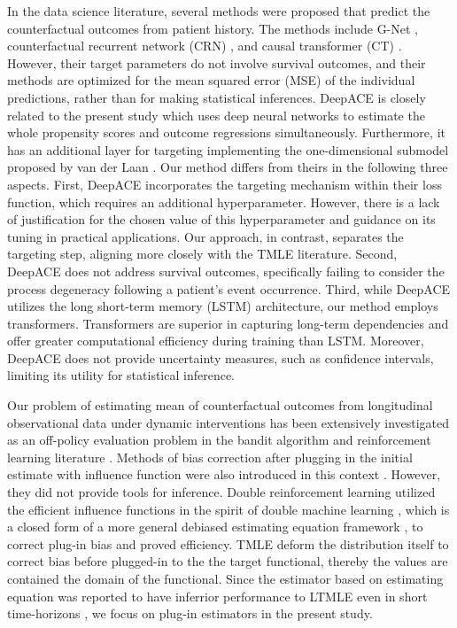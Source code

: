 \documentclass{article}
\theoremstyle{plain}
\theoremstyle{definition}
\theoremstyle{remark}
\begin{document}
In the data science literature, several methods were proposed that predict the counterfactual outcomes from patient history. The methods include G-Net \cite{liGNetDeepLearning2020a}, counterfactual recurrent network (CRN) \cite{Bica2020Estimating}, and causal transformer (CT) \cite{pmlr-v162-melnychuk22a}. However, their target parameters do not involve survival outcomes, and their methods are optimized for the mean squared error (MSE) of the individual predictions, rather than for making statistical inferences. DeepACE \cite{Frauen_Hatt_Melnychuk_Feuerriegel_2023} is closely related to the present study which uses deep neural networks to estimate the whole propensity scores and outcome regressions simultaneously. Furthermore, it has an additional layer for targeting implementing the one-dimensional submodel proposed by van der Laan \cite{van2018targeted}. Our method differs from theirs in the following three aspects. First, DeepACE incorporates the targeting mechanism within their loss function, which requires an additional hyperparameter. However, there is a lack of justification for the chosen value of this hyperparameter and guidance on its tuning in practical applications. Our approach, in contrast, separates the targeting step, aligning more closely with the TMLE literature. Second, DeepACE does not address survival outcomes, specifically failing to consider the process degeneracy following a patient's event occurrence. Third, while DeepACE utilizes the long short-term memory (LSTM) architecture, our method employs transformers. Transformers are superior in capturing long-term dependencies and offer greater computational efficiency during training than LSTM. Moreover, DeepACE does not provide uncertainty measures, such as confidence intervals, limiting its utility for statistical inference.

Our problem of estimating mean of counterfactual outcomes from longitudinal observational data under dynamic interventions has been extensively investigated as an off-policy evaluation problem in the bandit algorithm and reinforcement learning literature \cite{levineORL}. Methods of bias correction after plugging in the initial estimate with influence function were also introduced in this context \cite{jiangDROPE,farajtabarMRDROPE,naritaDOPE}. However, they did not provide tools for inference. Double reinforcement learning \cite{ueharaDRL} utilized the efficient influence functions in the spirit of double machine learning \cite{chernozhukovDML}, which is a closed form of a more general debiased estimating equation framework \cite{cherLocally}, to correct plug-in bias and proved efficiency. TMLE deform the distribution itself to correct bias before plugged-in to the the target functional, thereby the values are contained the domain of the functional. Since the estimator based on estimating equation was reported to have inferrior performance to LTMLE even in short time-horizons \cite{tran_double_2019}, we focus on plug-in estimators in the present study.
\end{document}

